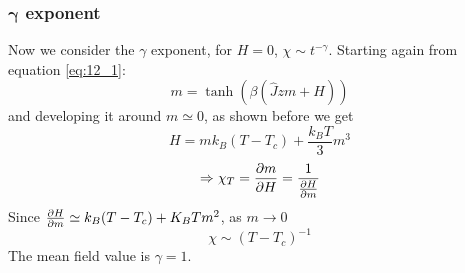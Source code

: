 \documentclass[../../Main/Main.tex]{subfiles}
\begin{document}
\subsubsection{\( \pmb{\gamma}   \) exponent}
Now we consider the \( \gamma   \) exponent, for \( H=0 \), \( \chi \sim t^{-\gamma  } \).   Starting again from equation \eqref{eq:12_1}:
\begin{equation*}
  m = \tanh (\beta (\hat{J}zm+H ))
\end{equation*}
and developing it around \( m \simeq 0 \), as shown before we get
\begin{equation*}
  H = m k_B (T-T_c)+ \frac{k_B T}{3}m^3
\end{equation*}
\begin{equation*}
  \Rightarrow \chi _T = \pdv{m}{H} = \frac{1}{\pdv{H}{m} }
\end{equation*}
Since \( \pdv{H}{m} \simeq k_B (T-T_c) + K_B T m^2 \), as \( m \rightarrow 0 \)
\begin{equation}
  \chi \sim (T-T_c)^{-1}
\end{equation}
The mean field value is \( \gamma =1  \).
\end{document}
